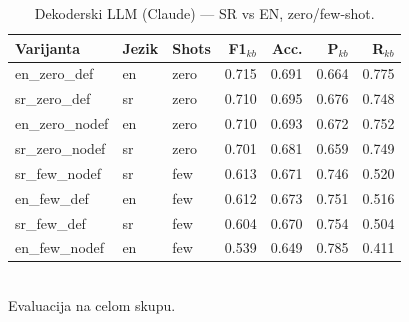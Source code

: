 \begin{table}[H]\centering
\caption{Dekoderski LLM (Claude) --- SR vs EN, zero/few-shot.}\label{tab:decoder}
\begin{tabular}{lllrrrr}
\toprule
Varijanta & Jezik & Shots & F1$_{kb}$ & Acc. & P$_{kb}$ & R$_{kb}$ \\
\midrule
en\_zero\_def & en & zero & 0.715 & 0.691 & 0.664 & 0.775 \\
sr\_zero\_def & sr & zero & 0.710 & 0.695 & 0.676 & 0.748 \\
en\_zero\_nodef & en & zero & 0.710 & 0.693 & 0.672 & 0.752 \\
sr\_zero\_nodef & sr & zero & 0.701 & 0.681 & 0.659 & 0.749 \\
sr\_few\_nodef & sr & few & 0.613 & 0.671 & 0.746 & 0.520 \\
en\_few\_def & en & few & 0.612 & 0.673 & 0.751 & 0.516 \\
sr\_few\_def & sr & few & 0.604 & 0.670 & 0.754 & 0.504 \\
en\_few\_nodef & en & few & 0.539 & 0.649 & 0.785 & 0.411 \\
\bottomrule
\end{tabular}
\\[2pt]\footnotesize Evaluacija na celom skupu.
\end{table}
